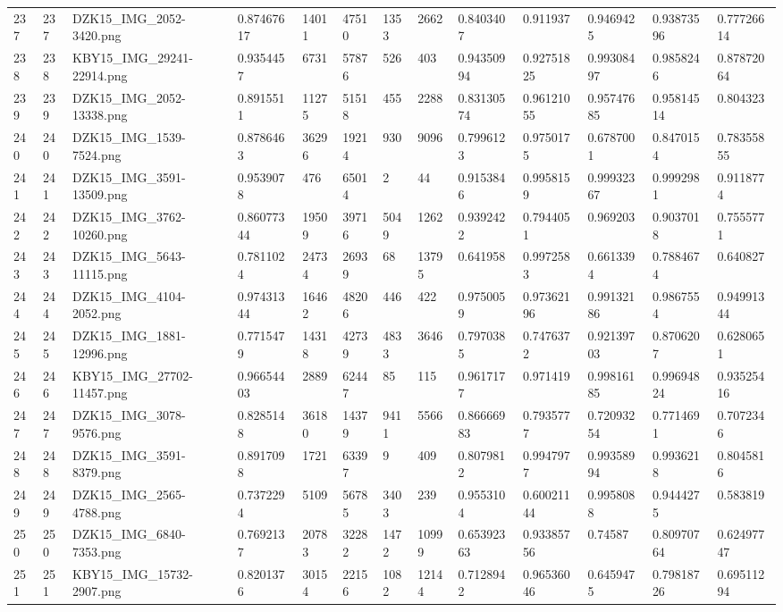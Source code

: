 \documentclass[11pt, a4paper, twoside]{report}
\begin{document}
\begin{longtable}[c]{@{}lllllllllllll@{}}
237 & 237 & DZK15\_IMG\_2052-3420.png & 0.87467617 & 14011 & 47510 & 1353 & 2662 & 0.8403407 & 0.911937 & 0.9469425 & 0.93873596 & 0.77726614 \\
238 & 238 & KBY15\_IMG\_29241-22914.png & 0.9354457 & 6731 & 57876 & 526 & 403 & 0.94350994 & 0.92751825 & 0.99308497 & 0.9858246 & 0.87872064 \\
239 & 239 & DZK15\_IMG\_2052-13338.png & 0.8915511 & 11275 & 51518 & 455 & 2288 & 0.83130574 & 0.96121055 & 0.95747685 & 0.95814514 & 0.804323 \\
240 & 240 & DZK15\_IMG\_1539-7524.png & 0.8786463 & 36296 & 19214 & 930 & 9096 & 0.7996123 & 0.9750175 & 0.6787001 & 0.8470154 & 0.78355855 \\
241 & 241 & DZK15\_IMG\_3591-13509.png & 0.9539078 & 476 & 65014 & 2 & 44 & 0.9153846 & 0.9958159 & 0.99932367 & 0.9992981 & 0.9118774 \\
242 & 242 & DZK15\_IMG\_3762-10260.png & 0.86077344 & 19509 & 39716 & 5049 & 1262 & 0.9392422 & 0.7944051 & 0.969203 & 0.9037018 & 0.7555771 \\
243 & 243 & DZK15\_IMG\_5643-11115.png & 0.7811024 & 24734 & 26939 & 68 & 13795 & 0.641958 & 0.9972583 & 0.6613394 & 0.7884674 & 0.640827 \\
244 & 244 & DZK15\_IMG\_4104-2052.png & 0.97431344 & 16462 & 48206 & 446 & 422 & 0.9750059 & 0.97362196 & 0.99132186 & 0.9867554 & 0.94991344 \\
245 & 245 & DZK15\_IMG\_1881-12996.png & 0.7715479 & 14318 & 42739 & 4833 & 3646 & 0.7970385 & 0.7476372 & 0.92139703 & 0.8706207 & 0.6280651 \\
246 & 246 & KBY15\_IMG\_27702-11457.png & 0.96654403 & 2889 & 62447 & 85 & 115 & 0.9617177 & 0.971419 & 0.99816185 & 0.99694824 & 0.93525416 \\
247 & 247 & DZK15\_IMG\_3078-9576.png & 0.8285148 & 36180 & 14379 & 9411 & 5566 & 0.86666983 & 0.7935777 & 0.72093254 & 0.7714691 & 0.7072346 \\
248 & 248 & DZK15\_IMG\_3591-8379.png & 0.8917098 & 1721 & 63397 & 9 & 409 & 0.8079812 & 0.9947977 & 0.99358994 & 0.9936218 & 0.8045816 \\
249 & 249 & DZK15\_IMG\_2565-4788.png & 0.7372294 & 5109 & 56785 & 3403 & 239 & 0.9553104 & 0.60021144 & 0.9958088 & 0.9444275 & 0.583819 \\
250 & 250 & DZK15\_IMG\_6840-7353.png & 0.7692137 & 20783 & 32282 & 1472 & 10999 & 0.65392363 & 0.93385756 & 0.74587 & 0.80970764 & 0.62497747 \\
251 & 251 & KBY15\_IMG\_15732-2907.png & 0.8201376 & 30154 & 22156 & 1082 & 12144 & 0.7128942 & 0.96536046 & 0.6459475 & 0.79818726 & 0.69511294 \\

\end{longtable}
\end{document}
